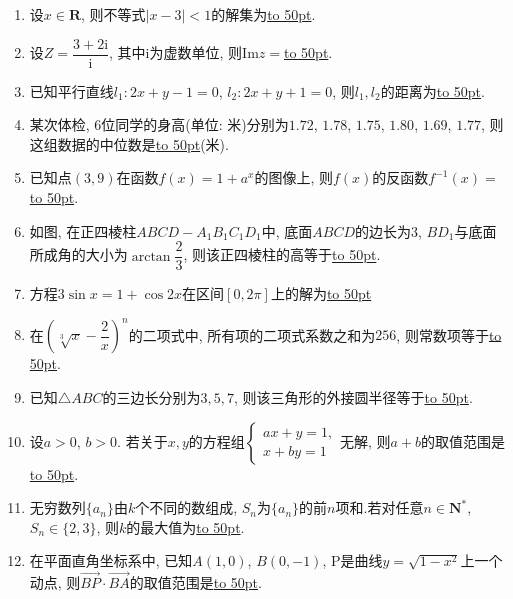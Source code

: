 \documentclass[10pt,a4paper]{article}
\newcommand{\blank}[1]{\underline{\hbox to #1pt{}}}
\begin{document}
\begin{enumerate}[1.]
\item 设$x\in \mathbf{R}$, 则不等式$|x-3|<1$的解集为\blank{50}.
\item 设$Z=\dfrac{3+2\mathrm{i}}{\mathrm{i}}$, 其中$\mathrm{i}$为虚数单位, 则$\mathrm{Im}z=$\blank{50}.
\item 已知平行直线$l_1:2x+y-1=0$, $l_2:2x+y+1=0$, 则$l_1,l_2$的距离为\blank{50}.
\item 某次体检, $6$位同学的身高(单位: 米)分别为$1.72$, $1.78$, $1.75$, $1.80$, $1.69$, $1.77$, 则这组数据的中位数是\blank{50}(米).
\item 已知点$(3,9)$在函数$f(x)=1+a^x$的图像上, 则$f(x)$的反函数$f^{-1}(x)=$\blank{50}.
\item 如图, 在正四棱柱$ABCD-A_1B_1C_1D_1$中, 底面$ABCD$的边长为$3$, $BD_1$与底面所成角的大小为$\arctan \dfrac 23$, 则该正四棱柱的高等于\blank{50}.
\begin{center}
\end{center}
\item 方程$3\sin x=1+\cos 2x$在区间$[0,2\pi]$上的解为\blank{50}
\item 在$(\sqrt[3]x-\dfrac 2x)^n$的二项式中, 所有项的二项式系数之和为$256$, 则常数项等于\blank{50}.
\item 已知$\triangle ABC$的三边长分别为$3, 5, 7$, 则该三角形的外接圆半径等于\blank{50}.
\item 设$a>0$, $b>0$. 若关于$x,y$的方程组$\begin{cases}
ax+y=1, \\ x+by=1  \end{cases}$无解, 则$a+b$的取值范围是\blank{50}.
\item 无穷数列$\{a_n\}$由$k$个不同的数组成, $S_n$为$\{a_n\}$的前$n$项和.若对任意$n\in \mathbf{N}^*$, $S_n\in \{2,3\}$, 则$k$的最大值为\blank{50}.
\item 在平面直角坐标系中, 已知$A(1, 0)$, $B(0, -1)$, P是曲线$y=\sqrt {1-x^2}$上一个动点, 则$\overrightarrow{BP}\cdot \overrightarrow{BA}$的取值范围是\blank{50}.

\end{enumerate}
\end{document}
